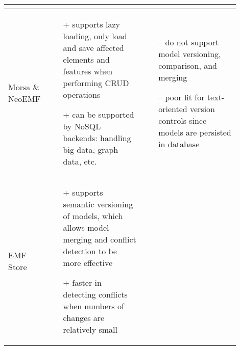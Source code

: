 \begin{table*}[]
\begin{scriptsize}
\begin{tabular}{
        |>{\centering\arraybackslash}m{0.1\linewidth}
        |>{\centering\arraybackslash}m{0.4\linewidth}
        |>{\centering\arraybackslash}m{0.4\linewidth}
        |}
\begin{minipage}[t]{\linewidth}
\begin{itemize}[leftmargin=7pt]
        \end{itemize}
      \end{minipage}
      \\
      \hline
      Morsa \& NeoEMF
      &
      \begin{minipage}[t]{\linewidth}
        \raggedright
        \vspace{-12pt}
        \begin{itemize}[leftmargin=7pt]
          \setlength
          \item[+] supports lazy loading, only load and save affected elements and features when performing CRUD operations
          \item[+] can be supported by NoSQL backends: handling big data, graph data, etc.
          \item[]
        \end{itemize}
      \end{minipage}
      &
      \begin{minipage}[t]{\linewidth}
        \raggedright
        \vspace{-12pt}
        \begin{itemize}[leftmargin=7pt]
          \setlength
          \item[--] do not support model versioning, comparison, and merging
          \item[--] poor fit for text-oriented version controls since models are persisted in database
          \item[]
        \end{itemize}
      \end{minipage}
      \\
      \hline
      EMF Store
      &
      \begin{minipage}[t]{\linewidth}
        \raggedright
        \vspace{-12pt}
        \begin{itemize}[leftmargin=7pt]
          \setlength
          \item[+] supports semantic versioning of models, which allows model merging and conflict detection to be more effective
          \item[+] faster in detecting conflicts when numbers of changes are relatively small
          \item[]
        \end{itemize}
      \end{minipage}

\end{tabular}
\end{scriptsize}
\end{table*}
